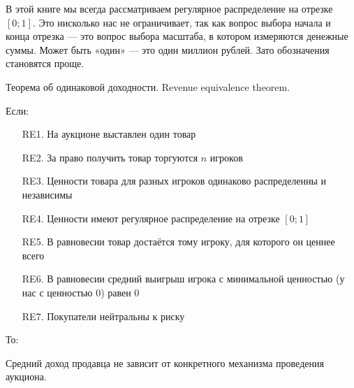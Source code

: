 В этой книге мы всегда рассматриваем регулярное распределение на отрезке $[0;1]$. Это нисколько нас не ограничивает, так как вопрос выбора начала и конца отрезка — это вопрос выбора масштаба, в котором измеряются денежные суммы. Может быть «один» — это один миллион рублей. Зато обозначения становятся проще.


\begin{myth} Теорема об одинаковой доходности. Revenue equivalence theorem. 


Если:

\begin{itemize}
\item[RE1.] На аукционе выставлен один товар
\item[RE2.] За право получить товар торгуются $ n $ игроков
\item[RE3.] Ценности товара для разных игроков одинаково распределенны и независимы
\item[RE4.] Ценности имеют регулярное распределение на отрезке $ [0;1] $
\item[RE5.] В равновесии товар достаётся тому игроку, для которого он ценнее всего
\item[RE6.] В равновесии средний выигрыш игрока с минимальной ценностью (у нас с ценностью 0) равен 0
\item[RE7.] Покупатели нейтральны к риску
\end{itemize}

То:

Средний доход продавца не зависит от конкретного механизма проведения аукциона.

\end{myth}


